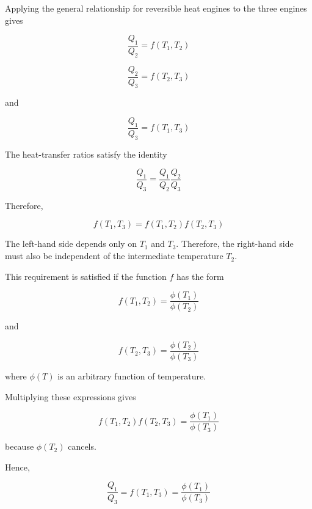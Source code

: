 \documentclass[12pt]{article}
\begin{document}
Applying the general relationship for reversible heat engines to the three engines gives

\begin{equation*}
\frac{Q_1}{Q_2}=f(T_1,T_2)
\end{equation*}

\begin{equation*}
\frac{Q_2}{Q_3}=f(T_2,T_3)
\end{equation*}

and

\begin{equation*}
\frac{Q_1}{Q_3}=f(T_1,T_3)
\end{equation*}

The heat-transfer ratios satisfy the identity

\begin{equation*}
\frac{Q_1}{Q_3}
=
\frac{Q_1}{Q_2}
\frac{Q_2}{Q_3}
\end{equation*}

Therefore,

\begin{equation*}
f(T_1,T_3)
=
f(T_1,T_2)f(T_2,T_3)
\end{equation*}

The left-hand side depends only on $T_1$ and $T_3$. Therefore, the right-hand side must also be independent of the intermediate temperature $T_2$.

This requirement is satisfied if the function $f$ has the form

\begin{equation*}
f(T_1,T_2)
=
\frac{\phi(T_1)}{\phi(T_2)}
\end{equation*}

and

\begin{equation*}
f(T_2,T_3)
=
\frac{\phi(T_2)}{\phi(T_3)}
\end{equation*}

where $\phi(T)$ is an arbitrary function of temperature.

Multiplying these expressions gives

\begin{equation*}
f(T_1,T_2)f(T_2,T_3)
=
\frac{\phi(T_1)}{\phi(T_3)}
\end{equation*}

because $\phi(T_2)$ cancels.

Hence,

\begin{equation*}
\frac{Q_1}{Q_3}
=
f(T_1,T_3)
=
\frac{\phi(T_1)}{\phi(T_3)}
\end{equation*}
\end{document}
